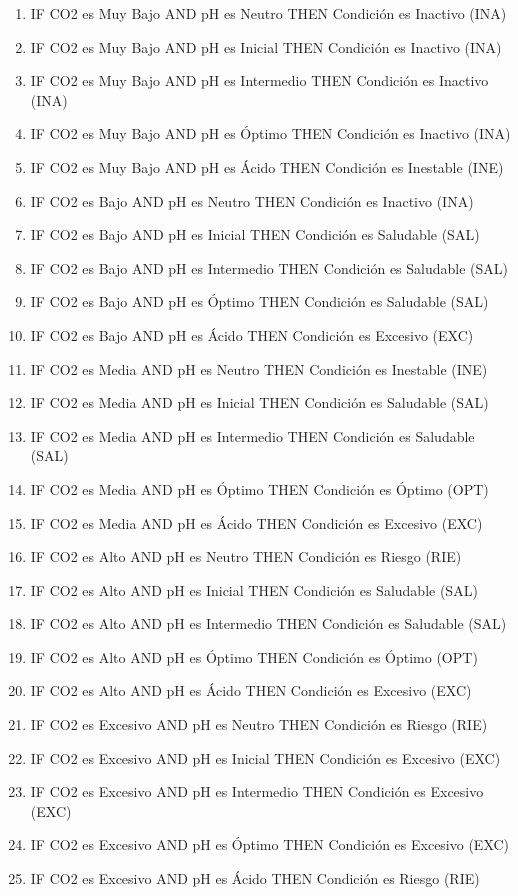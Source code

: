 \begin{enumerate}

\item IF CO2 es Muy Bajo AND pH es Neutro THEN Condición es Inactivo (INA)
\item IF CO2 es Muy Bajo AND pH es Inicial THEN Condición es Inactivo (INA)
\item IF CO2 es Muy Bajo AND pH es Intermedio THEN Condición es Inactivo (INA)
\item IF CO2 es Muy Bajo AND pH es Óptimo THEN Condición es Inactivo (INA)
\item IF CO2 es Muy Bajo AND pH es Ácido THEN Condición es Inestable (INE)

\item IF CO2 es Bajo AND pH es Neutro THEN Condición es Inactivo (INA)
\item IF CO2 es Bajo AND pH es Inicial THEN Condición es Saludable (SAL)
\item IF CO2 es Bajo AND pH es Intermedio THEN Condición es Saludable (SAL)
\item IF CO2 es Bajo AND pH es Óptimo THEN Condición es Saludable (SAL)
\item IF CO2 es Bajo AND pH es Ácido THEN Condición es Excesivo (EXC)

\item IF CO2 es Media AND pH es Neutro THEN Condición es Inestable (INE)
\item IF CO2 es Media AND pH es Inicial THEN Condición es Saludable (SAL)
\item IF CO2 es Media AND pH es Intermedio THEN Condición es Saludable (SAL)
\item IF CO2 es Media AND pH es Óptimo THEN Condición es Óptimo (OPT)
\item IF CO2 es Media AND pH es Ácido THEN Condición es Excesivo (EXC)

\item IF CO2 es Alto AND pH es Neutro THEN Condición es Riesgo (RIE)
\item IF CO2 es Alto AND pH es Inicial THEN Condición es Saludable (SAL)
\item IF CO2 es Alto AND pH es Intermedio THEN Condición es Saludable (SAL)
\item IF CO2 es Alto AND pH es Óptimo THEN Condición es Óptimo (OPT)
\item IF CO2 es Alto AND pH es Ácido THEN Condición es Excesivo (EXC)

\item IF CO2 es Excesivo AND pH es Neutro THEN Condición es Riesgo (RIE)
\item IF CO2 es Excesivo AND pH es Inicial THEN Condición es Excesivo (EXC)
\item IF CO2 es Excesivo AND pH es Intermedio THEN Condición es Excesivo (EXC)
\item IF CO2 es Excesivo AND pH es Óptimo THEN Condición es Excesivo (EXC)
\item IF CO2 es Excesivo AND pH es Ácido THEN Condición es Riesgo (RIE)

\end{enumerate}

